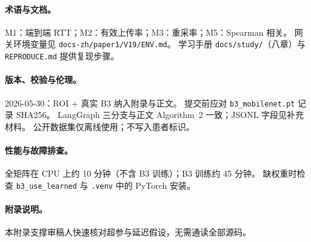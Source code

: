 \paragraph{术语与文档。}
M1：端到端 RTT；M2：有效上传率；M3：重采率；M5：Spearman 相关。
网关环境变量见 \texttt{docs-zh/paper1/V19/ENV.md}。
学习手册 \texttt{docs/study/}（八章）与 \texttt{REPRODUCE.md} 提供复现步骤。

\paragraph{版本、校验与伦理。}
2026-05-30：ROI + 真实 B3 纳入附录与正文。
提交前应对 \texttt{b3\_mobilenet.pt} 记录 SHA256。
LangGraph 三分支与正文 Algorithm~2 一致；JSONL 字段见补充材料。
公开数据集仅离线使用；不写入患者标识。

\paragraph{性能与故障排查。}
全矩阵在 CPU 上约 10 分钟（不含 B3 训练）；B3 训练约 45 分钟。
缺权重时检查 \texttt{b3\_use\_learned} 与 \texttt{.venv} 中的 PyTorch 安装。

\paragraph{附录说明。}
本附录支撑审稿人快速核对超参与延迟假设，无需通读全部源码。
